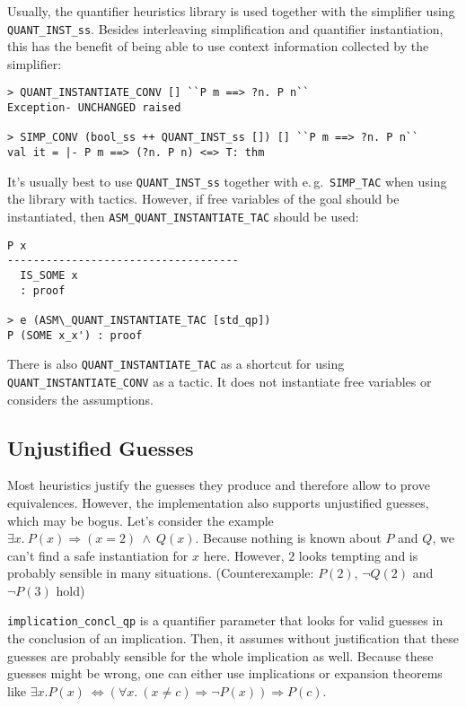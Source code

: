 \documentclass[a4paper,12pt,DIV=12,oneside]{scrbook}
\theoremstyle{definition}
\theoremstyle{remark}
\begin{document}
Usually, the quantifier heuristics library is used together with the
simplifier using \texttt{QUANT\_INST\_ss}. Besides interleaving
simplification and quantifier instantiation, this has the benefit of
being able to use context information collected by the simplifier:

{\scriptsize
\begin{verbatim}
> QUANT_INSTANTIATE_CONV [] ``P m ==> ?n. P n``
Exception- UNCHANGED raised

> SIMP_CONV (bool_ss ++ QUANT_INST_ss []) [] ``P m ==> ?n. P n``
val it = |- P m ==> (?n. P n) <=> T: thm
\end{verbatim}}

It's usually best to use \texttt{QUANT\_INST\_ss}
together with e.\,g.\ \texttt{SIMP\_TAC} when using the library with tactics.
However, if free variables of the goal should be instantiated, then
\texttt{ASM\_QUANT\_INSTANTIATE\_TAC} should be used:

{\scriptsize
\begin{verbatim}
P x
------------------------------------
  IS_SOME x
  : proof

> e (ASM\_QUANT_INSTANTIATE_TAC [std_qp])
P (SOME x_x') : proof
\end{verbatim}}

There is also \texttt{QUANT\_INSTANTIATE\_TAC} as a shortcut
for using \texttt{QUANT\_INSTANTIATE\_CONV} as a tactic. It does not
instantiate free variables or considers the assumptions.


\subsection{Unjustified Guesses}

Most heuristics justify the guesses they produce and therefore allow to
prove equivalences.
However, the implementation also supports unjustified guesses, which may be bogus.
Let's consider the example $\exists x.\ P(x) \Longrightarrow (x = 2)\ \wedge\ Q(x)$.
Because nothing is known about $P$ and $Q$, we can't find a safe instantiation for $x$ here.
However, $2$ looks tempting and is probably sensible in many situations. (Counterexample:
$P(2)$, $\neg Q(2)$ and $\neg P(3)$ hold)

\texttt{implication\_concl\_qp} is a quantifier parameter that looks for valid guesses in the conclusion of an implication.
Then, it assumes without justification that these guesses are probably sensible for the whole implication as well.
Because these guesses might be wrong, one can either use implications or
expansion theorems like $\exists x. P(x)\ \Leftrightarrow (\forall x.\ (x \neq c) \Rightarrow \neg P(x)) \Rightarrow P(c)$.
\end{document}
